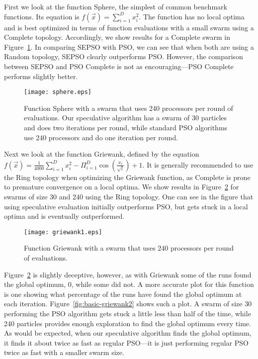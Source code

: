 \documentclass[journal,letterpaper]{IEEEtran}
\newcommand{\fig}[1]{Figure~\ref{fig:#1}}
\begin{document}
First we look at the function Sphere, the simplest of common benchmark
functions.  Its equation is $f(\Vec{x}) = \sum_{i=1}^D x_i^2$.  The function
has no local optima and is best optimized in terms of function evaluations with
a small swarm using a Complete topology.  Accordingly, we show results for a
Complete swarm in \fig{basic-sphere}.  In comparing SEPSO with PSO, we can see
that when both are using a Random topology, SEPSO clearly outperforms PSO.
However, the comparison between SEPSO and PSO Complete is not as
encouraging---PSO Complete performs slightly better.

\begin{figure}
  \centering
  \texttt{[image: sphere.eps]}
  \caption{Function Sphere with a swarm that uses 240 processors per round of
  evaluations.  Our speculative algorithm has a swarm of 30 particles and does
  two iterations per round, while standard PSO algorithms use 240 processors
  and do one iteration per round.}
  \label{fig:basic-sphere}
\end{figure}

Next we look at the function Griewank, defined by the equation $f(\Vec{x}) =
\frac{1}{4000} \sum_{i=1}^D x_i^2 - \Pi_{i=1}^D \cos\left(\frac{x_i}{\sqrt{i}}
\right) + 1$.  It is generally recommended to use the Ring topology when
optimizing the Griewank function, as Complete is prone to premature convergence
on a local optima.  We show results in \fig{basic-griewank1} for swarms of size
30 and 240 using the Ring topology. One can see in the figure that using
speculative evaluation initially outperforms PSO, but gets stuck in a local
optima and is eventually outperformed.  

\begin{figure}
  \centering
  \texttt{[image: griewank1.eps]}
  \caption{Function Griewank with a swarm that uses 240 processors per round of
  evaluations.}
  \label{fig:basic-griewank1}
\end{figure}

\fig{basic-griewank1} is slightly deceptive, however, as with Griewank some of
the runs found the global optimum, 0, while some did not.  A more accurate plot
for this function is one showing what percentage of the runs have found the
global optimum at each iteration.  \fig{basic-griewank2} shows such a plot.  A
swarm of size 30 performing the PSO algorithm gets stuck a little less than
half of the time, while 240 particles provides enough exploration to find the
global optimum every time.  As would be expected, when our speculative
algorithm finds the global optimum, it finds it about twice as fast as regular
PSO---it is just performing regular PSO twice as fast with a smaller swarm
size.
\end{document}
